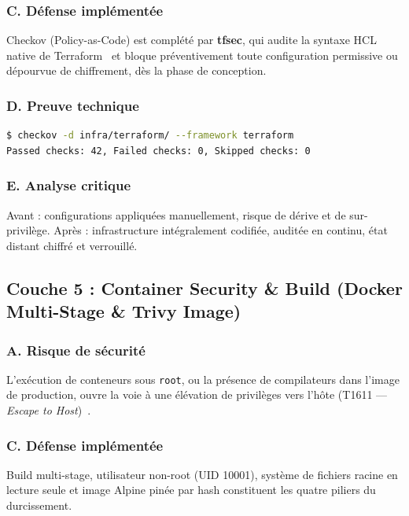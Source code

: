 \subsubsection{C. Défense implémentée}
Checkov (Policy-as-Code) est complété par \textbf{tfsec}, qui audite la syntaxe HCL native de Terraform~\cite{morris_iac_2020} et bloque préventivement toute configuration permissive ou dépourvue de chiffrement, dès la phase de conception.

\subsubsection{D. Preuve technique}
\begin{lstlisting}[language=bash, caption={Validation Checkov sur les modules Terraform}, label={lst:checkov_proof_layer}]
$ checkov -d infra/terraform/ --framework terraform
Passed checks: 42, Failed checks: 0, Skipped checks: 0
\end{lstlisting}

\subsubsection{E. Analyse critique}
Avant : configurations appliquées manuellement, risque de dérive et de sur-privilège. Après : infrastructure intégralement codifiée, auditée en continu, état distant chiffré et verrouillé.

\subsection{Couche 5 : Container Security \& Build (Docker Multi-Stage \& Trivy Image)}

\subsubsection{A. Risque de sécurité}
L'exécution de conteneurs sous \texttt{root}, ou la présence de compilateurs dans l'image de production, ouvre la voie à une élévation de privilèges vers l'hôte (T1611 — \textit{Escape to Host})~\cite{sultan_container_security_2019}.

\subsubsection{C. Défense implémentée}
Build multi-stage, utilisateur non-root (UID 10001), système de fichiers racine en lecture seule et image Alpine pinée par hash constituent les quatre piliers du durcissement.


